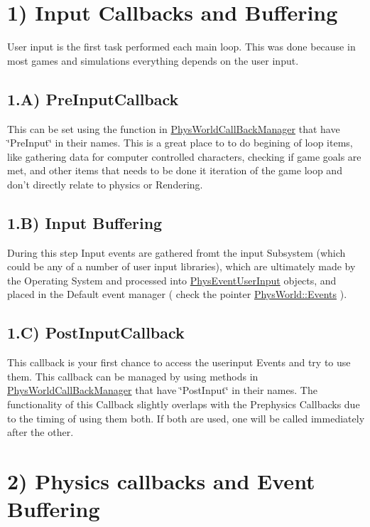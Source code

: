  \hypertarget{dd/d99/mainloop1_callbacks1}{}\section{1) Input Callbacks and Buffering}\label{dd/d99/mainloop1_callbacks1}
User input is the first task performed each main loop. This was done because in most games and simulations everything depends on the user input. \hypertarget{dd/d99/mainloop1_input1}{}\subsection{1.A) PreInputCallback}\label{dd/d99/mainloop1_input1}
This can be set using the function in \hyperlink{classPhysWorldCallBackManager}{PhysWorldCallBackManager} that have \char`\"{}PreInput\char`\"{} in their names. This is a great place to to do begining of loop items, like gathering data for computer controlled characters, checking if game goals are met, and other items that needs to be done it iteration of the game loop and don't directly relate to physics or Rendering. \hypertarget{dd/d99/mainloop1_input2}{}\subsection{1.B) Input Buffering}\label{dd/d99/mainloop1_input2}
During this step Input events are gathered fromt the input Subsystem (which could be any of a number of user input libraries), which are ultimately made by the Operating System and processed into \hyperlink{classPhysEventUserInput}{PhysEventUserInput} objects, and placed in the Default event manager ( check the pointer \hyperlink{classPhysWorld_a601b3c6093aaf2a69fcd3311dde9aadc}{PhysWorld::Events} ). \hypertarget{dd/d99/mainloop1_input3}{}\subsection{1.C) PostInputCallback}\label{dd/d99/mainloop1_input3}
This callback is your first chance to access the userinput Events and try to use them. This callback can be managed by using methods in \hyperlink{classPhysWorldCallBackManager}{PhysWorldCallBackManager} that have \char`\"{}PostInput\char`\"{} in their names. The functionality of this Callback slightly overlaps with the Prephysics Callbacks due to the timing of using them both. If both are used, one will be called immediately after the other. \par
 \hypertarget{dd/d99/mainloop1_callbacks2}{}\section{2) Physics callbacks and Event Buffering}\label{dd/d99/mainloop1_callbacks2}

